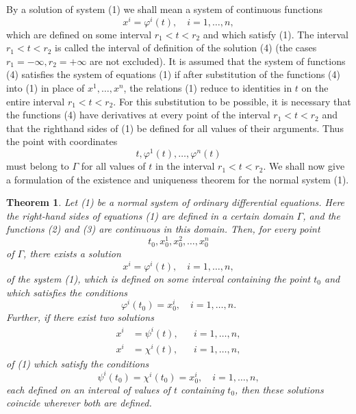 \documentclass[10pt,a5paper]{book}
\theoremstyle{plain}
\newtheorem{theorem}{Theorem}
\theoremstyle{definition}
\theoremstyle{remark}
\begin{document}
By a solution of system (1) we shall mean a system of continuous functions
\begin{equation*}
x^{i}=\varphi^{i}(t), \quad i=1, \ldots, n, \tag{4}
\end{equation*}
which are defined on some interval $r_{1}<t<r_{2}$ and which satisfy (1). The interval $r_{1}<t<r_{2}$ is called the interval of definition of the solution (4) (the cases $r_{1}=-\infty, r_{2}=+\infty$ are not excluded). It is assumed that the system of functions (4) satisfies the system of equations (1) if after substitution of the functions (4) into (1) in place of $x^{1}, \ldots, x^{n}$, the relations (1) reduce to identities in $t$ on the entire interval $r_{1}<t<r_{2}$. For this substitution to be possible, it is necessary that the functions (4) have derivatives at every point of the interval $r_{1}<t<r_{2}$ and that the righthand sides of (1) be defined for all values of their arguments. Thus the point with coordinates
\[
t, \varphi^{1}(t), \ldots, \varphi^{n}(t)
\]
must belong to $\Gamma$ for all values of $t$ in the interval $r_{1}<t<r_{2}$. We shall
now give a formulation of the existence and uniqueness theorem for the normal system (1).

\begin{theorem}
Let (1) be a normal system of ordinary differential equations. Here the right-hand sides of equations (1) are defined in a certain domain $\Gamma$, and the functions (2) and (3) are continuous in this domain. Then, for every point
\begin{equation*}
t_{0}, x_{0}^{1}, x_{0}^{2}, \ldots, x_{0}^{n} \tag{5}
\end{equation*}
of $\Gamma$, there exists a solution
\begin{equation*}
x^{i}=\varphi^{i}(t), \quad i=1, \ldots, n, \tag{6}
\end{equation*}
of the system (1), which is defined on some interval containing the point $t_{0}$ and which satisfies the conditions
\begin{equation*}
\varphi^{i}\left(t_{0}\right)=x_{0}^{i}, \quad i=1, \ldots, n . \tag{7}
\end{equation*}
Further, if there exist two solutions
\begin{align*}
x^{i} & =\psi^{i}(t), & & i=1, \ldots, n, \\
x^{i} & =\chi^{i}(t), & & i=1, \ldots, n, \tag{8}
\end{align*}
of (1) which satisfy the conditions
\begin{equation*}
\psi^{i}\left(t_{0}\right)=\chi^{i}\left(t_{0}\right)=x_{0}^{i}, \quad i=1, \ldots, n, \tag{9}
\end{equation*}
each defined on an interval of values of $t$ containing $t_{0}$, then these solutions coincide wherever both are defined.
\end{theorem}
\end{document}
